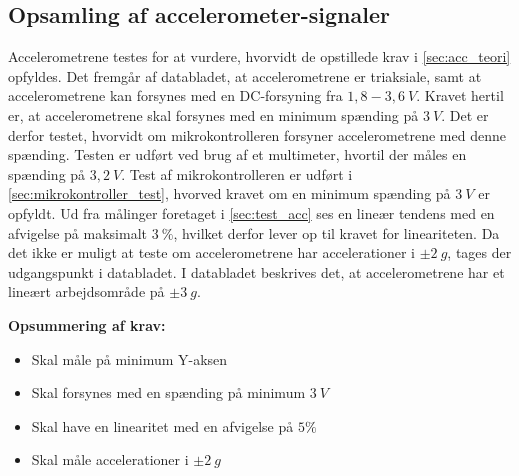 \subsection{Opsamling af accelerometer-signaler}

Accelerometrene testes for at vurdere, hvorvidt de opstillede krav i \autoref{sec:acc_teori} opfyldes. 
Det fremgår af databladet, at accelerometrene er triaksiale, samt at accelerometrene kan forsynes med en DC-forsyning fra $1,8-3,6~V$. Kravet hertil er, at accelerometrene skal forsynes med en minimum spænding på $3~V$. Det er derfor testet, hvorvidt om mikrokontrolleren forsyner accelerometrene med denne spænding. Testen er udført ved brug af et multimeter, hvortil der måles en spænding på $3,2~V$. Test af mikrokontrolleren er udført i \autoref{sec:mikrokontroller_test}, hvorved kravet om en minimum spænding på $3~V$ er opfyldt.
Ud fra målinger foretaget i \autoref{sec:test_acc} ses en lineær tendens med en afvigelse på maksimalt $3~\%$, hvilket derfor lever op til kravet for lineariteten. Da det ikke er muligt at teste om accelerometrene har accelerationer i $\pm2~g$, tages der udgangspunkt i databladet. I databladet beskrives det, at accelerometrene har et lineært arbejdsområde på $\pm 3~g$.

\vspace{3mm}
\textbf{Opsummering af krav:}
\begin{itemize}
\item[\text{\sffamily \checkmark}] Skal måle på minimum Y-aksen
\item[\text{\sffamily \checkmark}] Skal forsynes med en spænding på minimum $3~V$
\item[\text{\sffamily \checkmark}] Skal have en linearitet med en afvigelse på $5\%$
\item[\text{\sffamily \checkmark}] Skal måle accelerationer i $\pm2~g$
\end{itemize}

